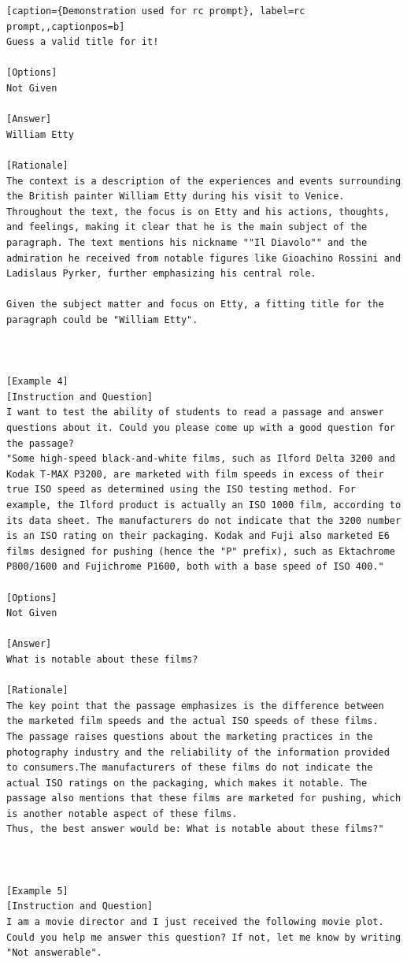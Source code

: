 \begin{lstlisting}[caption={Demonstration used for rc prompt}, label=rc prompt,,captionpos=b]
Guess a valid title for it!

[Options]
Not Given

[Answer]
William Etty

[Rationale]
The context is a description of the experiences and events surrounding the British painter William Etty during his visit to Venice. Throughout the text, the focus is on Etty and his actions, thoughts, and feelings, making it clear that he is the main subject of the paragraph. The text mentions his nickname ""Il Diavolo"" and the admiration he received from notable figures like Gioachino Rossini and Ladislaus Pyrker, further emphasizing his central role.

Given the subject matter and focus on Etty, a fitting title for the paragraph could be "William Etty".



[Example 4]
[Instruction and Question]
I want to test the ability of students to read a passage and answer questions about it. Could you please come up with a good question for the passage?
"Some high-speed black-and-white films, such as Ilford Delta 3200 and Kodak T-MAX P3200, are marketed with film speeds in excess of their true ISO speed as determined using the ISO testing method. For example, the Ilford product is actually an ISO 1000 film, according to its data sheet. The manufacturers do not indicate that the 3200 number is an ISO rating on their packaging. Kodak and Fuji also marketed E6 films designed for pushing (hence the "P" prefix), such as Ektachrome P800/1600 and Fujichrome P1600, both with a base speed of ISO 400."

[Options]
Not Given

[Answer]
What is notable about these films?

[Rationale]
The key point that the passage emphasizes is the difference between the marketed film speeds and the actual ISO speeds of these films.
The passage raises questions about the marketing practices in the photography industry and the reliability of the information provided to consumers.The manufacturers of these films do not indicate the actual ISO ratings on the packaging, which makes it notable. The passage also mentions that these films are marketed for pushing, which is another notable aspect of these films.
Thus, the best answer would be: What is notable about these films?"



[Example 5]
[Instruction and Question]
I am a movie director and I just received the following movie plot. 
Could you help me answer this question? If not, let me know by writing "Not answerable".


\end{lstlisting}
